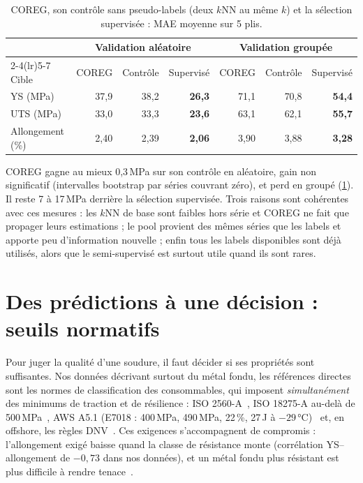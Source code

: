 \documentclass[11pt,a4paper]{article}
\begin{document}
\begin{table}[!htb]
\centering
\small
\caption{COREG, son contrôle sans pseudo-labels (deux $k$NN au même $k$) et la
sélection supervisée : MAE moyenne sur 5 plis.}
\label{tab:coreg}
\begin{tabular}{@{}l rrr rrr@{}}
\toprule
 & \multicolumn{3}{c}{Validation aléatoire} & \multicolumn{3}{c}{Validation groupée} \\
\cmidrule(lr){2-4}\cmidrule(lr){5-7}
Cible & COREG & Contrôle & Supervisé & COREG & Contrôle & Supervisé \\
\midrule
YS (MPa)         & 37,9 & 38,2 & \textbf{26,3} & 71,1 & 70,8 & \textbf{54,4} \\
UTS (MPa)        & 33,0 & 33,3 & \textbf{23,6} & 63,1 & 62,1 & \textbf{55,7} \\
Allongement (\%) & 2,40 & 2,39 & \textbf{2,06} & 3,90 & 3,88 & \textbf{3,28} \\
\bottomrule
\end{tabular}
\end{table}

COREG gagne au mieux 0,3\,MPa sur son contrôle en aléatoire, gain non
significatif (intervalles bootstrap par séries couvrant zéro), et perd en groupé
(\cref{tab:coreg}). Il reste 7 à 17\,MPa derrière la sélection supervisée. Trois
raisons sont cohérentes avec ces mesures : les $k$NN de base sont faibles hors
série et COREG ne fait que propager leurs estimations ; le pool provient des
mêmes séries que les labels et apporte peu d'information nouvelle ; enfin tous
les labels disponibles sont déjà utilisés, alors que le semi-supervisé est surtout
utile quand ils sont rares.

\section{Des prédictions à une décision : seuils normatifs}
\label{sec:seuils}

Pour juger la qualité d'une soudure, il faut décider si ses propriétés sont
suffisantes. Nos données décrivant surtout du métal fondu, les références
directes sont les normes de classification des consommables, qui imposent
\emph{simultanément} des minimums de traction et de résilience :
ISO 2560-A~\cite{iso_2560,twi_consumables}, ISO 18275-A au-delà de
500\,MPa~\cite{iso_18275}, AWS A5.1 (E7018 : 400\,MPa, 490\,MPa, 22\,\%, 27\,J à
$-29$\,°C)~\cite{aws_a51} et, en offshore, les règles DNV~\cite{dnv_os_c401}.
Ces exigences s'accompagnent de compromis : l'allongement exigé baisse quand la
classe de résistance monte (corrélation YS--allongement de $-0{,}73$ dans nos
données), et un métal fondu plus résistant est plus difficile à rendre
tenace~\cite{keehan_2001,mehmanparast_2018}.
\end{document}
